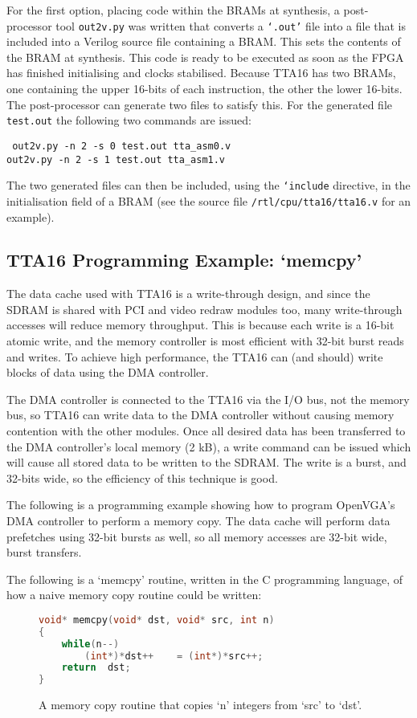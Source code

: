 For the first option, placing code within the BRAMs at synthesis, a
post-processor tool \texttt{out2v.py} was written that converts a \texttt{`.out'}
file into a file that is included into a Verilog source file containing a BRAM.
This sets the contents of the BRAM at synthesis. This code is ready to be
executed as soon as the FPGA has finished initialising and clocks stabilised.
Because TTA16 has two BRAMs, one containing the upper 16-bits of each
instruction, the other the lower 16-bits. The post-processor can generate two
files to satisfy this. For the generated file \texttt{test.out} the following two
commands are issued:
\begin{center}
\tt
out2v.py -n 2 -s 0 test.out tta\_asm0.v	\\
out2v.py -n 2 -s 1 test.out tta\_asm1.v
\rm
\end{center}
The two generated files can then be included, using the \texttt{`include}
directive, in the initialisation field of a BRAM (see the source file
\texttt{/rtl/cpu/tta16/tta16.v} for an example).


\subsection{TTA16 Programming Example: `memcpy'}
The data cache used with TTA16 is a write-through design, and since the SDRAM
is shared with PCI and video redraw modules too, many write-through accesses
will reduce memory throughput. This is because each write is a 16-bit atomic
write, and the memory controller is most efficient with 32-bit burst reads and
writes. To achieve high performance, the TTA16 can (and should) write blocks of
data using the DMA controller.

The DMA controller is connected to the TTA16 via the I/O bus, not the memory
bus, so TTA16 can write data to the DMA controller without causing memory
contention with the other modules. Once all desired data has been transferred
to the DMA controller's local memory (2 kB), a write command can be issued
which will cause all stored data to be written to the SDRAM. The write is a
burst, and 32-bits wide, so the efficiency of this technique is good.

The following is a programming example showing how to program OpenVGA's DMA
controller to perform a memory copy. The data cache will perform data
prefetches using 32-bit bursts as well, so all memory accesses are 32-bit wide,
burst transfers.

The following is a `memcpy' routine, written in the C programming language, of
how a naive memory copy routine could be written:
\begin{figure}[h!]
\begin{lstlisting}[language=C]
void* memcpy(void* dst, void* src, int n)
{
	while(n--)
		(int*)*dst++	= (int*)*src++;
	return	dst;
}
\end{lstlisting}
\caption[C `memcpy' Example]{A memory copy routine that copies `n' integers
from `src' to `dst'.}
\label{TTAPROG_C_memcpy}
\end{figure}


